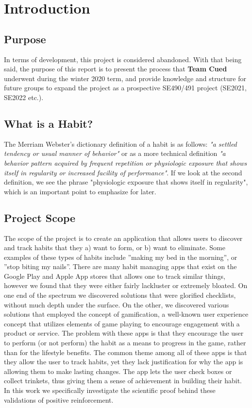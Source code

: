 \section{Introduction}

\subsection{Purpose}
In terms of development, this project is considered abandoned. With that being said, the purpose of this report is to present the process that \textbf{Team Cued} underwent during the winter 2020 term, and provide knowledge and structure for future groups to expand the project as a prospective SE490/491 project (SE2021, SE2022 etc.).
\subsection{What is a Habit?}
The Merriam Webster's dictionary definition of a habit is as follows: \textit{"a settled tendency or usual manner of behavior"} or as a more technical definition \textit{"a behavior pattern acquired by frequent repetition or physiologic exposure that shows itself in regularity or increased facility of performance"}. If we look at the second definition, we see the phrase "physiologic exposure that shows itself in regularity", which is an important point to emphasize for later. 

\subsection{Project Scope}
The scope of the project is to create an application that allows users to discover and track habits that they a) want to form, or b) want to eliminate. Some examples of these types of habits include ”making my bed in the morning”, or ”stop biting my nails”. There are many habit managing apps that exist on the Google Play and Apple App stores that allows one to track similar things, however we found that they were either fairly lackluster or extremely bloated. On one end of the spectrum we discovered solutions that were glorified checklists, without much depth under the surface. On the other, we discovered various solutions that employed the concept of gamification, a well-known user experience concept that utilizes elements of game playing to encourage engagement with a product or service. The problem with these apps is that they encourage the user to perform (or not perform) the habit as a means to progress in the game, rather than for the lifestyle benefits. The common theme among all of these apps is that they allow the user to track habits, yet they lack  justification for why the app is allowing them to make lasting changes. The app lets the user check boxes or collect trinkets, thus giving them a sense of achievement in building their habit. In this work we specifically investigate the scientific proof behind these validations of positive reinforcement.
